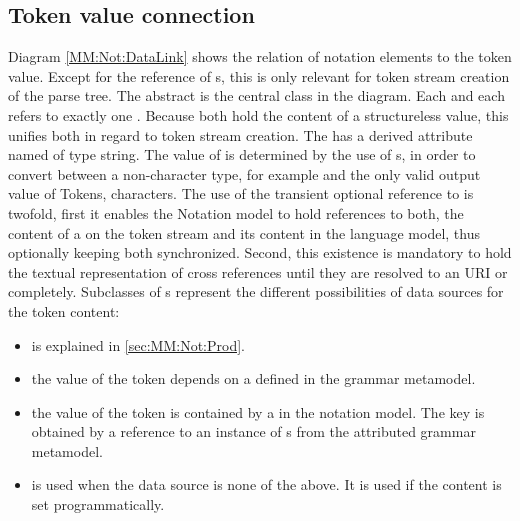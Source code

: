 \subsection{Token value connection}
Diagram \ref{MM:Not:DataLink} shows the relation of notation elements to the token value. Except for the  reference of s, this is only relevant for token stream creation of the parse tree. The abstract  is the central class in the diagram. Each  and each  refers to exactly one . Because both hold the content of a structureless value, this unifies both in regard to token stream creation. The  has a derived attribute named  of type string. The value of  is determined by the use of s, in order to convert between a non-character type, for example  and the only valid output value of Tokens, characters. The use of the transient optional reference to  is twofold, first it enables the Notation model to hold references to both, the content of a  on the token stream and its content in the language model, thus optionally keeping both synchronized. Second, this existence is mandatory to hold the textual representation of cross references until they are resolved to an URI or completely. Subclasses of s represent the different possibilities of data sources for the token content:
\begin{itemize}
	\item {} is explained in \ref{sec:MM:Not:Prod}.
	\item {} the value of the token depends on a   defined in the grammar metamodel.
	\item {} the value of the token is contained by a  in the notation model. The key is obtained by a reference to an instance of s from the attributed grammar metamodel.
	\item {} is used when the data source is none of the above. It is used if the content is set programmatically.
\end{itemize}


